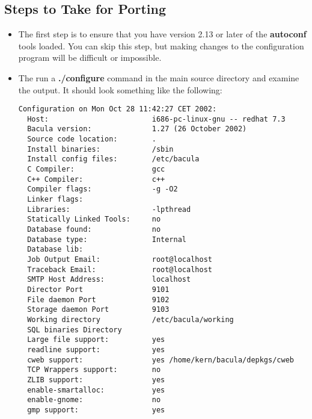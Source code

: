 \subsection*{Steps to Take for Porting}

\begin{itemize}
\item The first step is to ensure that you have version 2.13 or later  of the
   {\bf autoconf} tools loaded. You can skip this step, but  making changes to
   the configuration program will be difficult or  impossible. 
\item The run a {\bf ./configure} command in the main source directory  and
   examine the output. It should look something like the  following:  

\footnotesize
\begin{verbatim}
Configuration on Mon Oct 28 11:42:27 CET 2002:
  Host:                        i686-pc-linux-gnu -- redhat 7.3
  Bacula version:              1.27 (26 October 2002)
  Source code location:        .
  Install binaries:            /sbin
  Install config files:        /etc/bacula
  C Compiler:                  gcc
  C++ Compiler:                c++
  Compiler flags:              -g -O2
  Linker flags:
  Libraries:                   -lpthread
  Statically Linked Tools:     no
  Database found:              no
  Database type:               Internal
  Database lib:
  Job Output Email:            root@localhost
  Traceback Email:             root@localhost
  SMTP Host Address:           localhost
  Director Port                9101
  File daemon Port             9102
  Storage daemon Port          9103
  Working directory            /etc/bacula/working
  SQL binaries Directory
  Large file support:          yes
  readline support:            yes
  cweb support:                yes /home/kern/bacula/depkgs/cweb
  TCP Wrappers support:        no
  ZLIB support:                yes
  enable-smartalloc:           yes
  enable-gnome:                no
  gmp support:                 yes
\end{verbatim}
\normalsize


\end{itemize}
